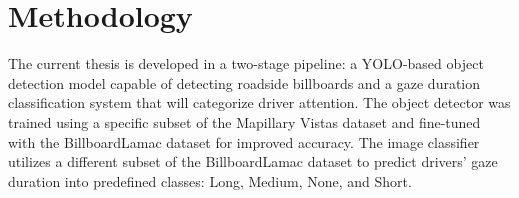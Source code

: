 \chapter{Methodology}\label{ch:methodology}

The current thesis is developed in a two-stage pipeline: a YOLO-based object detection model capable of detecting roadside billboards and a gaze duration classification system that will categorize driver attention. The object detector was trained using a specific subset of the Mapillary Vistas dataset and fine-tuned with the BillboardLamac dataset for improved accuracy. The image classifier utilizes a different subset of the BillboardLamac dataset to predict drivers' gaze duration into predefined classes: Long, Medium, None, and Short.





